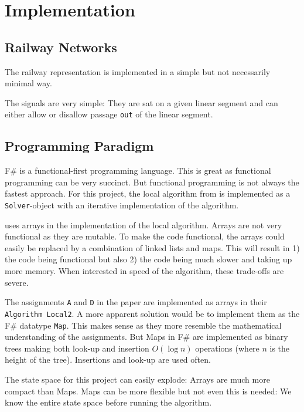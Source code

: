 \chapter{Implementation} %
\label{chpt:implementation}

\section{Railway Networks}

The railway representation is implemented in a simple but not necessarily
minimal way. 

The signals are very simple: They are sat on a given linear segment and can
either allow or disallow passage \texttt{out} of the linear segment. 

\section{Programming Paradigm} %
\label{sec:programming-paradigm}

F\# is a functional-first programming language. This is great as functional
programming can be very succinct. But functional programming is not always the
fastest approach. For this project, the local algorithm from
\cite{liuSimpleLineartimeAlgorithms1998} is
implemented as a \texttt{Solver}-object with an iterative implementation of the
algorithm. 

\cite{liuSimpleLineartimeAlgorithms1998} uses arrays in the implementation of the local algorithm. Arrays
are not very functional as they are mutable. To make the code functional, the
arrays could easily be replaced by a combination of linked lists and maps. This
will result in 1) the code being functional but also 2) the code being much
slower and taking up more memory. When interested in speed of the algorithm,
these trade-offs are severe. 

The assignments \texttt{A} and \texttt{D} in the paper are implemented as arrays
in their \texttt{Algorithm Local2}. A more apparent solution would be to
implement them as the F\# datatype \texttt{Map}. This makes sense as they more
resemble the mathematical understanding of the assignments. But Maps in F\# are
implemented as binary trees making both look-up and insertion $O(\log n)$
operations (where $n$ is the height of the tree). Insertions and look-up are
used often. 


The state space for this project can easily explode: Arrays are much more
compact than Maps. Maps can be more flexible but not even this is needed: We
know the entire state space before running the algorithm. 

